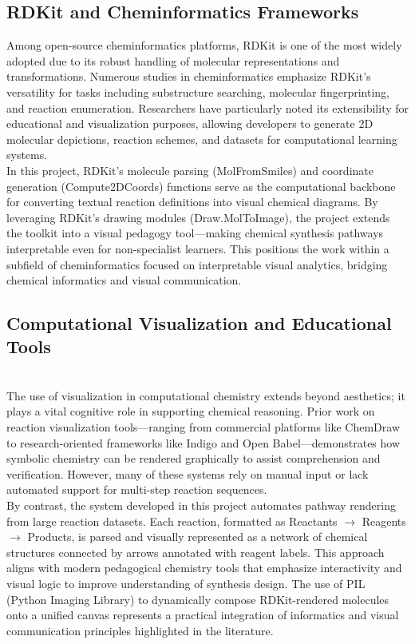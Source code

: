 \documentclass[12pt]{article}
\begin{document}
\subsection{RDKit and Cheminformatics Frameworks}
\indent
Among open-source cheminformatics platforms, RDKit is one of the most widely adopted due to its robust handling of molecular representations and transformations. 
Numerous studies in cheminformatics emphasize RDKit’s versatility for tasks including substructure searching, molecular fingerprinting, and reaction enumeration.
Researchers have particularly noted its extensibility for educational and visualization purposes, allowing developers to generate 2D molecular depictions, reaction schemes, and datasets for computational learning systems.
\\
In this project, RDKit’s molecule parsing (MolFromSmiles) and coordinate generation (Compute2DCoords) functions serve as the computational backbone for converting textual reaction definitions into visual chemical diagrams.
By leveraging RDKit’s drawing modules (Draw.MolToImage), the project extends the toolkit into a visual pedagogy tool—making chemical synthesis pathways interpretable even for non-specialist learners.
This positions the work within a subfield of cheminformatics focused on interpretable visual analytics, bridging chemical informatics and visual communication.
\\
\subsection{Computational Visualization and Educational Tools}
\\
\indent
The use of visualization in computational chemistry extends beyond aesthetics; it plays a vital cognitive role in supporting chemical reasoning.
Prior work on reaction visualization tools—ranging from commercial platforms like ChemDraw to research-oriented frameworks like Indigo and Open Babel—demonstrates how symbolic chemistry can be rendered graphically to assist comprehension and verification.
However, many of these systems rely on manual input or lack automated support for multi-step reaction sequences.
\\
\indent
By contrast, the system developed in this project automates pathway rendering from large reaction datasets. 
Each reaction, formatted as Reactants $\rightarrow$ Reagents $\rightarrow$ Products, is parsed and visually represented as a network of chemical structures connected by arrows annotated with reagent labels.
This approach aligns with modern pedagogical chemistry tools that emphasize interactivity and visual logic to improve understanding of synthesis design.
The use of PIL (Python Imaging Library) to dynamically compose RDKit-rendered molecules onto a unified canvas represents a practical integration of informatics and visual communication principles highlighted in the literature.
\\
\end{document}
